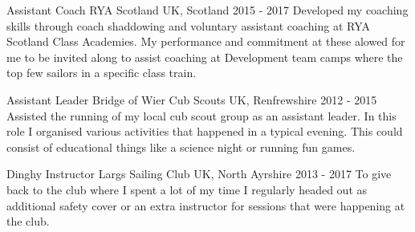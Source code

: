 

\begin{cventries}

  \cventry
    {Assistant Coach} %
    {RYA Scotland} %
    {UK, Scotland} %
    {2015 - 2017} %
    {
      Developed my coaching skills through coach shaddowing and voluntary assistant coaching at RYA Scotland Class Academies. My performance and commitment at these alowed for me to be invited along to assist coaching at Development team camps where the top few sailors in a specific class train.
    }
    

  \cventry
    {Assistant Leader} %
    {Bridge of Wier Cub Scouts} %
    {UK, Renfrewshire} %
    {2012 - 2015} %
    {
      Assisted the running of my local cub scout group as an assistant leader. In this role I organised various activities that happened in a typical evening. This could consist of educational things like a science night or running fun games.
    }

  \cventry
    {Dinghy Instructor} %
    {Largs Sailing Club} %
    {UK, North Ayrshire} %
    {2013 - 2017} %
    {
      To give back to the club where I spent a lot of my time I regularly headed out as additional safety cover or an extra instructor for sessions that were happening at the club.
    }

\end{cventries}
